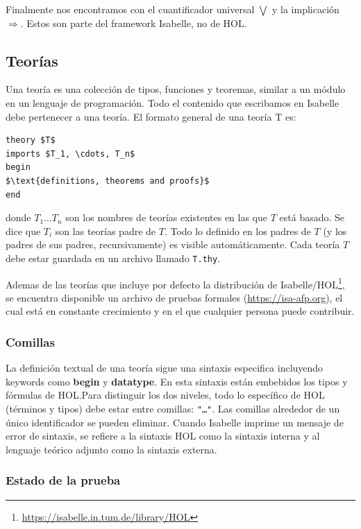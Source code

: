 \documentclass[12pt]{book}
\begin{document}
Finalmente nos encontramos con el cuantificador universal $\bigvee$ y la implicación $\Longrightarrow$. Estos son parte del framework Isabelle, no de HOL.\@

\subsection{Teorías}

Una teoría es una colección de tipos, funciones y teoremas, similar a un módulo en un lenguaje de programación. Todo el contenido que escribamos en Isabelle debe pertenecer a una teoría. El formato general de una teoría T es:

\begin{lstlisting}[style=Isabelle]
theory $T$
imports $T_1, \cdots, T_n$
begin
$\text{definitions, theorems and proofs}$
end
\end{lstlisting}

donde $T_1 \ldots T_n$ son los nombres de teorías existentes en las que $T$ está basado. Se dice que $T_i$ son las teorías padre de $T$. Todo lo definido en los padres de $T$ (y los padres de sus padres, recursivamente) es visible automáticamente. Cada teoría $T$ debe estar guardada en un archivo llamado \texttt{T.thy}.

Ademas de las teorías que incluye por defecto la distribución de Isabelle/HOL\footnote{\url{https://isabelle.in.tum.de/library/HOL}}, se encuentra disponible un archivo de pruebas formales (\url{https://isa-afp.org}), el cual está en constante crecimiento y en el que cualquier persona puede contribuir.


\subsubsection{Comillas}
La definición textual de una teoría sigue una sintaxis especifica incluyendo keywords como \textbf{begin} y \textbf{datatype}. En esta sintaxis están embebidos los tipos y fórmulas de HOL.\@ Para distinguir los dos niveles, todo lo específico de HOL (términos y tipos) debe estar entre comillas: \texttt{"\ldots"}. Las comillas alrededor de un único identificador se pueden eliminar. Cuando Isabelle imprime un mensaje de error de sintaxis, se refiere a la sintaxis HOL como la sintaxis interna y al lenguaje teórico adjunto como la sintaxis externa.%

\subsubsection{Estado de la prueba} 
\end{document}
